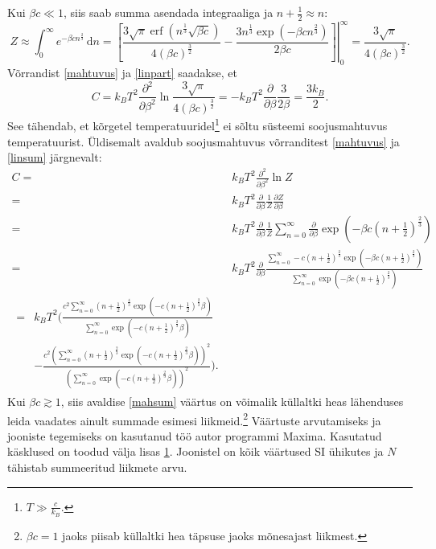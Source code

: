 \documentclass{trkut}%
\DeclareMathOperator{\erf}{erf}
\begin{document}
Kui $\beta c\ll 1$, siis saab summa asendada integraaliga ja $n+\frac{1}{2}\approx n$:
\begin{equation}
    Z \approx \int_0^\infty e^{-\beta c n^\frac{2}{3}} \, \mathrm{d}n = \left.\left[ \frac{3\sqrt{\pi}  \erf{\left( {n}^\frac{1}{3} \sqrt{\beta c}\right)} }{4 (\beta c)^\frac{3}{2}}-\frac{3n^\frac{1}{3} \exp\left(-\beta cn^\frac{2}{3}\right)}{2 \beta c }\right]\right|^{\infty}_{0} =\frac{3\sqrt{\pi}}{4(\beta c)^\frac{3}{2}} .
    \label{linpart}
\end{equation}
Võrrandist \eqref{mahtuvus} ja \eqref{linpart} saadakse, et
\begin{equation} \label{intmahtuvus}
    C=k_B T^2 \frac{\partial^2}{\partial \beta^2} \ln \frac{3\sqrt{\pi}}{4(\beta c)^\frac{3}{2}}=-k_BT^2\frac{\partial}{\partial \beta} \frac{3}{2\beta}=\frac{3k_B}{2}.
\end{equation}
See tähendab, et kõrgetel temperatuuridel\footnote{$T\gg \frac{c}{k_B}$.} ei sõltu süsteemi soojusmahtuvus temperatuurist.
Üldisemalt avaldub soojusmahtuvus võrranditest \eqref{mahtuvus} ja \eqref{linsum} järgnevalt:
\begin{align}
    C={}&k_B T^2 \frac{\partial^2}{\partial \beta^2} \ln Z \nonumber \\
    ={}&k_B T^2\frac{\partial}{\partial \beta}\frac{1}{Z} \frac{\partial Z}{\partial \beta} \nonumber \\
    ={}&k_B T^2\frac{\partial}{\partial \beta}\frac{1}{Z} \sum_{n=0}^{\infty} \frac{\partial}{\partial \beta} \exp \left( -\beta c \left(n+\frac{1}{2}\right)^\frac{2}{3} \right) \nonumber \\
    ={}&k_B T^2\frac{\partial}{\partial \beta} \frac{\sum_{n=0}^{\infty} -c\left(n+\frac{1}{2}\right)^\frac{2}{3} \exp \left( -\beta c \left(n+\frac{1}{2}\right)^\frac{2}{3} \right)}{\sum_{n=0}^{\infty} \exp \left( -\beta c \left(n+\frac{1}{2}\right)^\frac{2}{3} \right)} \nonumber \\
    \begin{split}\label{mahsum}
        ={}&k_B T^2 \Bigg( \frac{c^2 \sum_{n=0}^\infty \left( n+\frac{1}{2}\right)^\frac{4}{3} \exp \left( -c \left( n+\frac{1}{2} \right)^\frac{2}{3} \beta \right) }{\sum_{n=0}^\infty {{\exp}\left( -c {{\left( n+\frac{1}{2}\right) }^{\frac{2}{3}}} \beta \right)}}  \\
        & - \frac{c^2 \left( \sum_{n=0}^{\infty }{{{\left( n+\frac{1}{2}\right) }^{\frac{2}{3}}} {{ \exp}\left( -c {{\left( n+\frac{1}{2}\right) }^{\frac{2}{3}}} \beta \right)}}\right)^{2}}{{{\left( \sum_{n=0}^{\infty }{ {{\exp}\left( -c {{\left( n+\frac{1}{2}\right) }^{\frac{2}{3}}} \beta \right)}}\right) }^{2}}} \Bigg).
    \end{split}
\end{align}
Kui $\beta c \gtrsim 1$, siis avaldise \eqref{mahsum} väärtus on võimalik küllaltki heas lähenduses leida vaadates ainult summade esimesi liikmeid.\footnote{$\beta c =1$ jaoks piisab küllaltki hea täpsuse jaoks mõnesajast liikmest.}
Väärtuste arvutamiseks ja jooniste tegemiseks on kasutanud töö autor programmi Maxima.
Kasutatud käsklused on toodud välja lisas \hyperref[maximalisa]{1}.
Joonistel on kõik väärtused SI ühikutes ja $N$ tähistab summeeritud liikmete arvu.
\end{document}
